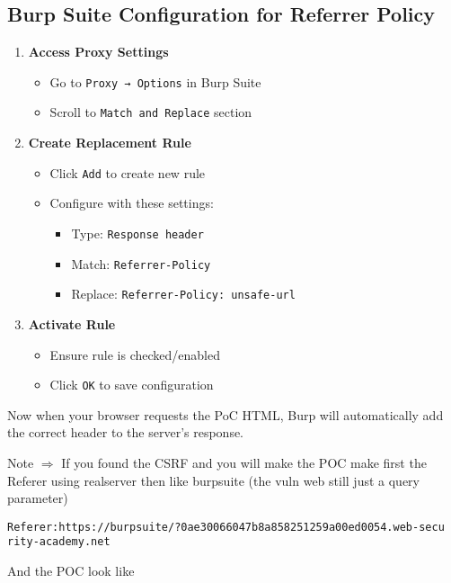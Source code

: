 \documentclass{article}
\begin{document}
\subsection*{Burp Suite Configuration for Referrer Policy}
\begin{enumerate}
    \item \textbf{Access Proxy Settings}
    \begin{itemize}
        \item Go to \texttt{Proxy → Options} in Burp Suite
        \item Scroll to \texttt{Match and Replace} section
    \end{itemize}
    
    \item \textbf{Create Replacement Rule}
    \begin{itemize}
        \item Click \texttt{Add} to create new rule
        \item Configure with these settings:
        \begin{itemize}
            \item Type: \texttt{Response header}
            \item Match: \texttt{Referrer-Policy}
            \item Replace: \texttt{Referrer-Policy: unsafe-url}
        \end{itemize}
    \end{itemize}
    
    \item \textbf{Activate Rule}
    \begin{itemize}
        \item Ensure rule is checked/enabled
        \item Click \texttt{OK} to save configuration
    \end{itemize}
\end{enumerate}
Now when your browser requests the PoC HTML, Burp will automatically add the correct header to the server's response.

Note $\Longrightarrow$ If you found the CSRF and you will make the POC make first the Referer using realserver then like burpsuite (the vuln web still just a query parameter)
\begin{lstlisting}[frame=single]
Referer:https://burpsuite/?0ae30066047b8a858251259a00ed0054.web-secu
rity-academy.net
\end{lstlisting}

And the POC look like
\end{document}
